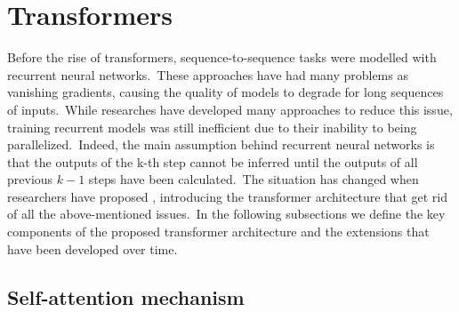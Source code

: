 \documentclass[longabstract, english, mgr]{iithesis}
\theoremstyle{default_theorem_style}\newtheorem{theorem}{Theorem}
\theoremstyle{default_theorem_style}\newtheorem{definition}{Definition}
\begin{document}
\section{Transformers}\label{sec:transformers}

Before the rise of transformers, sequence-to-sequence tasks were modelled with recurrent neural
networks.\ These approaches have had many problems as vanishing gradients, causing the quality of models to degrade
for long sequences of inputs.\ While researches have developed many approaches to reduce this issue, training recurrent
models was still inefficient due to their inability to being parallelized.\ Indeed, the main assumption behind
recurrent neural networks is that the outputs of the k-th step cannot be inferred until the outputs of all previous
$k - 1$ steps have been calculated.\ The situation has changed when researchers have proposed
\cite{transformer_model}, introducing the transformer architecture that get rid of all the above-mentioned
issues.\ In the following subsections we define the key components of the proposed transformer architecture and the
extensions that have been developed over time.

\subsection{Self-attention mechanism}\label{subsec:self_attention}
\end{document}
